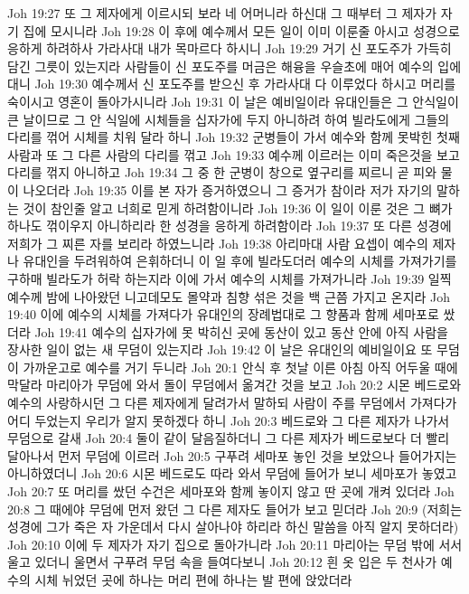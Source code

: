 Joh 19:27  또 그 제자에게 이르시되 보라 네 어머니라 하신대 그 때부터 그 제자가 자기 집에 모시니라
Joh 19:28  이 후에 예수께서 모든 일이 이미 이룬줄 아시고 성경으로 응하게 하려하사 가라사대 내가 목마르다 하시니
Joh 19:29  거기 신 포도주가 가득히 담긴 그릇이 있는지라 사람들이 신 포도주를 머금은 해융을 우슬초에 매어 예수의 입에 대니
Joh 19:30  예수께서 신 포도주를 받으신 후 가라사대 다 이루었다 하시고 머리를 숙이시고 영혼이 돌아가시니라
Joh 19:31  이 날은 예비일이라 유대인들은 그 안식일이 큰 날이므로 그 안 식일에 시체들을 십자가에 두지 아니하려 하여 빌라도에게 그들의 다리를 꺾어 시체를 치워 달라 하니
Joh 19:32  군병들이 가서 예수와 함께 못박힌 첫째 사람과 또 그 다른 사람의 다리를 꺾고
Joh 19:33  예수께 이르러는 이미 죽은것을 보고 다리를 꺾지 아니하고
Joh 19:34  그 중 한 군병이 창으로 옆구리를 찌르니 곧 피와 물이 나오더라
Joh 19:35  이를 본 자가 증거하였으니 그 증거가 참이라 저가 자기의 말하는 것이 참인줄 알고 너희로 믿게 하려함이니라
Joh 19:36  이 일이 이룬 것은 그 뼈가 하나도 꺾이우지 아니하리라 한 성경을 응하게 하려함이라
Joh 19:37  또 다른 성경에 저희가 그 찌른 자를 보리라 하였느니라
Joh 19:38  아리마대 사람 요셉이 예수의 제자나 유대인을 두려워하여 은휘하더니 이 일 후에 빌라도더러 예수의 시체를 가져가기를 구하매 빌라도가 허락 하는지라 이에 가서 예수의 시체를 가져가니라
Joh 19:39  일찍 예수께 밤에 나아왔던 니고데모도 몰약과 침향 섞은 것을 백 근쯤 가지고 온지라
Joh 19:40  이에 예수의 시체를 가져다가 유대인의 장례법대로 그 향품과 함께 세마포로 쌌더라
Joh 19:41  예수의 십자가에 못 박히신 곳에 동산이 있고 동산 안에 아직 사람을 장사한 일이 없는 새 무덤이 있는지라
Joh 19:42  이 날은 유대인의 예비일이요 또 무덤이 가까운고로 예수를 거기 두니라
Joh 20:1  안식 후 첫날 이른 아침 아직 어두울 때에 막달라 마리아가 무덤에 와서 돌이 무덤에서 옮겨간 것을 보고
Joh 20:2  시몬 베드로와 예수의 사랑하시던 그 다른 제자에게 달려가서 말하되 사람이 주를 무덤에서 가져다가 어디 두었는지 우리가 알지 못하겠다 하니
Joh 20:3  베드로와 그 다른 제자가 나가서 무덤으로 갈새
Joh 20:4  둘이 같이 달음질하더니 그 다른 제자가 베드로보다 더 빨리 달아나서 먼저 무덤에 이르러
Joh 20:5  구푸려 세마포 놓인 것을 보았으나 들어가지는 아니하였더니
Joh 20:6  시몬 베드로도 따라 와서 무덤에 들어가 보니 세마포가 놓였고
Joh 20:7  또 머리를 쌌던 수건은 세마포와 함께 놓이지 않고 딴 곳에 개켜 있더라
Joh 20:8  그 때에야 무덤에 먼저 왔던 그 다른 제자도 들어가 보고 믿더라
Joh 20:9  (저희는 성경에 그가 죽은 자 가운데서 다시 살아나야 하리라 하신 말씀을 아직 알지 못하더라)
Joh 20:10  이에 두 제자가 자기 집으로 돌아가니라
Joh 20:11  마리아는 무덤 밖에 서서 울고 있더니 울면서 구푸려 무덤 속을 들여다보니
Joh 20:12  흰 옷 입은 두 천사가 예수의 시체 뉘었던 곳에 하나는 머리 편에 하나는 발 편에 앉았더라
